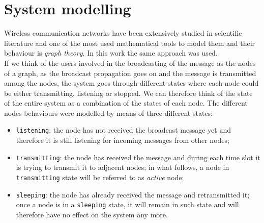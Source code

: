 %
\chapter{System modelling}\label{modelling}
Wireless communication networks have been extensively studied in scientific
literature and one of the most used mathematical tools to model them and their
behaviour is \textit{graph theory}. In this work the same approach was used.\\
If we think of the users involved in the broadcasting of the message as the
nodes of a graph, as the broadcast propagation goes on and the message is
transmitted among the nodes, the system goes through different states where each
node could be either transmitting, listening or stopped.
We can therefore think of the state of the entire system as a combination of
the states of each node. The different nodes behaviours were modelled by means
of three different states:
\begin{itemize}
	\item \texttt{listening}: the node has not received the broadcast message
	yet and therefore it is still listening for incoming messages from other nodes;
	\item \texttt{transmitting}: the node has received the message and during
	each time slot it is trying to transmit it to adjacent nodes; in what
	follows, a node in \texttt{transmitting} state will be referred to as
	\textit{active} node;
	\item \texttt{sleeping}: the node has already received the message and
	retransmitted it; once a node is in a \texttt{sleeping} state, it will
	remain in such state and will therefore have no	effect on the system any more.
\end{itemize}
